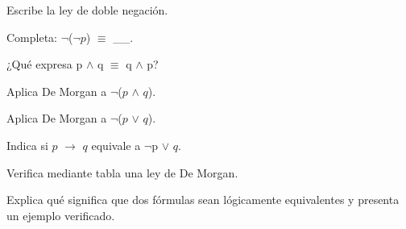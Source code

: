 \begin{activity}[id=dia-08-corta-01,type=short,weight=1]

Escribe la ley de doble negación.

\end{activity}

\begin{activity}[id=dia-08-corta-02,type=short,weight=1]

Completa: \(\neg\)(\(\neg p\)) \(\equiv\) __.

\end{activity}

\begin{activity}[id=dia-08-corta-03,type=short,weight=1]

¿Qué expresa p \(\land\) q \(\equiv\) q \(\land\) p?

\end{activity}

\begin{activity}[id=dia-08-corta-04,type=short,weight=1]

Aplica De Morgan a \(\neg\)(\(p\) \(\land\) \(q\)).

\end{activity}

\begin{activity}[id=dia-08-corta-05,type=short,weight=1]

Aplica De Morgan a \(\neg\)(\(p\) \(\lor\) \(q\)).

\end{activity}

\begin{activity}[id=dia-08-corta-06,type=short,weight=1]

Indica si \(p\) \(\to\) \(q\) equivale a \(\neg\)p \(\lor\) \(q\).

\end{activity}

\begin{activity}[id=dia-08-desarrollo-01,type=long,weight=2]

Verifica mediante tabla una ley de De Morgan.

\end{activity}

\begin{activity}[id=dia-08-desarrollo-02,type=long,weight=2]

Explica qué significa que dos fórmulas sean lógicamente equivalentes y presenta un ejemplo verificado.

\end{activity}

